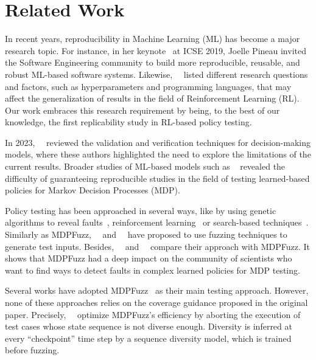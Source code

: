 \section{Related Work}
In recent years, reproducibility in Machine Learning (ML) has become a major research topic. 
For instance, in her keynote~\cite{icse19keynote} at ICSE 2019, Joelle Pineau invited the Software Engineering community to build more reproducible, reusable, and robust ML-based software systems. 
Likewise,~\citeauthor{henderson2018deep}~\cite{henderson2018deep} listed different research questions and factors, such as hyperparameters and programming languages, that may affect the generalization of results in the field of Reinforcement Learning (RL).
Our work embraces this research requirement by being, to the best of our knowledge, the first replicability study in RL-based policy testing.

In 2023,~\citeauthor{mazouni2023}~\cite{mazouni2023} reviewed the validation and verification techniques for decision-making models, where these authors highlighted the need to explore the limitations of the current results.
Broader studies of ML-based models such as ~\cite{ZHANG2020106296, 10.1007/s10515-022-00337-x, 10.1613/jair.1.12716} revealed the difficulty of guaranteeing reproducible studies in the field of testing learned-based policies for Markov Decision Processes (MDP).

Policy testing has been approached in several ways, like by using genetic algorithms to reveal faults~\cite{zolfagharian2023searchbased}, reinforcement learning~\cite{9712397, 10172658} or search-based techniques~\cite{https://doi.org/10.48550/arxiv.2205.04887}.
Similarly as MDPFuzz,~\citeauthor{Steinmetz_Fišer_Eniser_Ferber_Gros_Heim_Höller_Schuler_Wüstholz_Christakis_Hoffmann_2022}~\cite{Steinmetz_Fišer_Eniser_Ferber_Gros_Heim_Höller_Schuler_Wüstholz_Christakis_Hoffmann_2022} and~\citeauthor{10.1145/3533767.3534392}~\cite{10.1145/3533767.3534392} have proposed to use fuzzing techniques to generate test inputs.
Besides,~\citeauthor{model_based_fuzzer}~\cite{model_based_fuzzer} and~\citeauthor{ast2024}~\cite{ast2024} compare their approach with MDPFuzz. 
It shows that MDPFuzz had a deep impact on the community of scientists who want to find ways to detect faults in complex learned policies for MDP testing. 

Several works have adopted MDPFuzz~\cite{curefuzz, seqdivfuzz} as their main testing approach.
However, none of these approaches relies on the coverage guidance proposed in the original paper.
Precisely,~\citeauthor{seqdivfuzz}~\cite{seqdivfuzz} optimize MDPFuzz's efficiency by aborting the execution of test cases whose state sequence is not diverse enough.
Diversity is inferred at every ``checkpoint'' time step by a sequence diversity model, which is trained before fuzzing.

